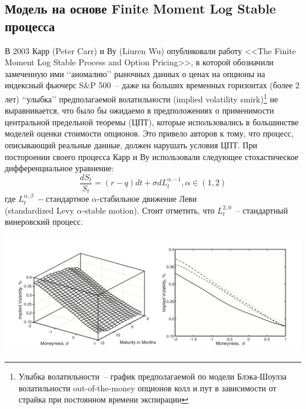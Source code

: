 \documentclass[oneside, final, 12pt, a4paper]{article}
\begin{document}
 
\newpage
\subsection{Модель на основе Finite Moment Log Stable процесса}
В 2003 Карр (Peter Carr) и Ву (Liuren Wu) опубликовали работу <<The Finite Moment Log Stable Process and Option Pricing>>, в которой обозначили замеченную ими \lq\lq{}аномалию\rq\rq{} рыночных данных о ценах на опционы на индексный фьючерс S\&P 500~-- даже на больших временных горизонтах (более 2 лет) \lq\lq{}улыбка\rq\rq{} предполагаемой волатильности (implied volatility smirk)\footnote{Улыбка волатильности~-- график предполагаемой по модели Блэка-Шоулза волатильности out-of-the-money опционов колл и пут в зависимости от страйка при постоянном времени экспирации} не выравнивается, что было бы ожидаемо в предположениях о применимости центральной предельной теоремы (ЦПТ), которые использовались в большинстве моделей оценки стоимости опционов. Это привело авторов к тому, что процесс, описывающий реальные данные, должен нарушать условия ЦПТ. При постороении своего процесса Карр и Ву использовали следующее стохастическое дифференциальное уравнение: 
\[ \frac{dS_t}{S_t} = (r - q)dt + \sigma dL_t^{\alpha, -1}, \alpha \in (1, 2)\] где \( L_t^{\alpha, \beta}~-\)стандартное $\alpha$-стабильное движение Леви\\(standardized
Levy $\alpha$-stable motion)\cite{Levy:paper}. Стоит отметить, что $L_t^{2, 0}$~-- стандартный винеровский процесс. 

\begin{center}
  \includegraphics[width=1\linewidth]{img/implied_volatility.png}
\end{center}


\newpage
\end{document}
